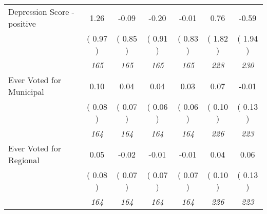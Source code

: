 \begin{tabular}{l c c c c c c}
Depression Score - positive &      1.26 &     -0.09 &     -0.20 &     -0.01 &      0.76 &     -0.59 \\
& (     0.97 ) & (     0.85 ) & (     0.91 ) & (     0.83 ) & (     1.82 ) & (     1.94 ) \\
& \textit{ 165 } & \textit{ 165 } & \textit{ 165 } & \textit{ 165 } & \textit{ 228 } & \textit{ 230 } \\
Ever Voted for Municipal &      0.10 &      0.04 &      0.04 &      0.03 &      0.07 &     -0.01 \\
& (     0.08 ) & (     0.07 ) & (     0.06 ) & (     0.06 ) & (     0.10 ) & (     0.13 ) \\
& \textit{ 164 } & \textit{ 164 } & \textit{ 164 } & \textit{ 164 } & \textit{ 226 } & \textit{ 223 } \\
Ever Voted for Regional &      0.05 &     -0.02 &     -0.01 &     -0.01 &      0.04 &      0.06 \\
& (     0.08 ) & (     0.07 ) & (     0.07 ) & (     0.07 ) & (     0.10 ) & (     0.13 ) \\
& \textit{ 164 } & \textit{ 164 } & \textit{ 164 } & \textit{ 164 } & \textit{ 226 } & \textit{ 223 } \\
\bottomrule
\end{tabular}
